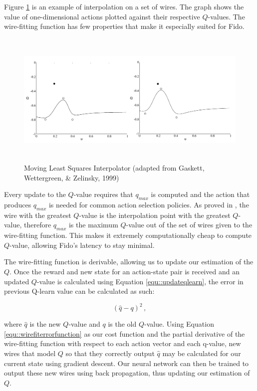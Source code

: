 Figure \ref{fig::wirefitexample} is an example of interpolation on a set of wires. The graph shows the value of one-dimensional actions plotted against their respective $Q$-values. The wire-fitting function has few properties that make it especially suited for Fido.

\begin{figure}[ht]
    \centering
    \includegraphics[height=6.5cm]{Figures/WireFit.png}
	\caption{Moving Least Squares Interpolator (adapted from Gaskett, Wettergreen, \& Zelinsky, 1999)}
    \label{fig::wirefitexample}
\end{figure}

Every update to the $Q$-value requires that $q_{max}$ is computed and the action that produces $q_{max}$ is needed for common action selection policies. As proved in \cite{baird}, the wire with the greatest $Q$-value is the interpolation point with the greatest $Q$-value, therefore $q_{max}$ is the maximum $Q$-value out of the set of wires given to the wire-fitting function. This makes it extremely computationally cheap to compute $Q$-value, allowing Fido's latency to stay minimal.

The wire-fitting function is derivable, allowing us to update our estimation of the $Q$. Once the reward and new state for an action-state pair is received and an updated $Q$-value is calculated using Equation \ref{equ::updateqlearn}, the error in previous Q-learn value can be calculated as such:

\begin{equation}
	(\hat{q} - q)^2
	\,,
	\label{equ::wirefiterrorfunction}
\end{equation}

\noindent
where $\hat{q}$ is the new $Q$-value and $q$ is the old $Q$-value. Using Equation \ref{equ::wirefiterrorfunction} as our cost function and the partial derivative of the wire-fitting function with respect to each action vector and each q-value, new wires that model $Q$ so that they correctly output $\hat{q}$ may be calculated for our current state using gradient descent. Our neural network can then be trained to output these new wires using back propagation, thus updating our estimation of $Q$.

